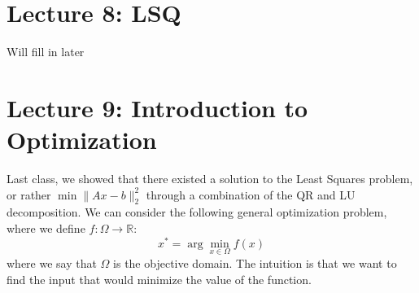 \documentclass[11pt]{article}
\theoremstyle{definition}
\newcommand{\R}{\mathbb{R}}
\begin{document}
\section{Lecture 8: LSQ}
Will fill in later
\section{Lecture 9: Introduction to Optimization}
Last class, we showed that there existed a solution to the Least Squares problem, or rather $\min \|Ax - b\|^2_2$ through a combination of the QR and LU decomposition. We can consider the following general optimization problem, where we define $f: \Omega \to \R$:
\[
x^* = \arg \min_{x \in \Omega} f(x)
\]
where we say that $\Omega$ is the objective domain. The intuition is that we want to find the input that would minimize the value of the function. 
\end{document}
